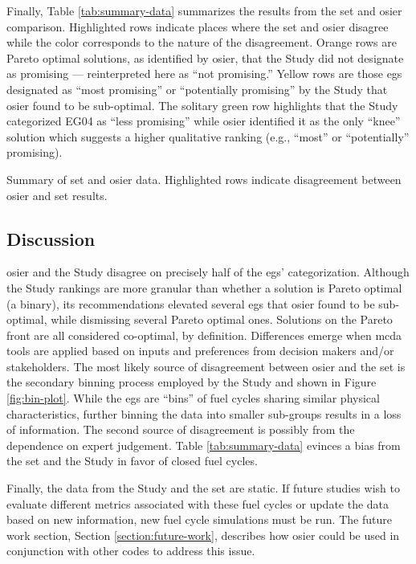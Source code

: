 \noindent
Finally, Table \ref{tab:summary-data} summarizes the results from the \ac{set}
and \ac{osier} comparison. Highlighted rows indicate places where the \ac{set}
and \ac{osier} disagree while the color corresponds to the nature of the
disagreement. Orange rows are Pareto optimal solutions, as identified by
\ac{osier}, that the Study did not designate as promising --- reinterpreted here
as ``not promising.'' Yellow rows are those \acp{eg} designated as ``most
promising'' or ``potentially promising'' by the Study that \ac{osier} found to
be sub-optimal. The solitary green row highlights that the Study categorized
EG04 as ``less promising'' while \ac{osier} identified it as the only ``knee''
solution which suggests a higher qualitative ranking (e.g., ``most'' or
``potentially'' promising). 

\begin{table}[htbp!]
    \centering
    \caption{Summary of \ac{set} and \ac{osier} data. Highlighted rows indicate
    disagreement between \ac{osier} and \ac{set} results.}
    \label{tab:summary-data}
    \resizebox*{\textwidth}{!}{}
\end{table}

\FloatBarrier

\subsection{Discussion}

\ac{osier} and the Study disagree on precisely half of the \acp{eg}'
categorization. Although the Study rankings are more granular than whether a
solution is Pareto optimal (a binary), its recommendations elevated several
\acp{eg} that \ac{osier} found to be sub-optimal, while dismissing several
Pareto optimal ones. Solutions on the Pareto front are all considered
co-optimal, by definition. Differences emerge when \ac{mcda} tools are applied
based on inputs and preferences from decision makers and/or stakeholders. The
most likely source of disagreement between \ac{osier} and the \ac{set} is the
secondary binning process employed by the Study and shown in Figure
\ref{fig:bin-plot}. While the \acp{eg} are ``bins'' of fuel cycles sharing
similar physical characteristics, further binning the data into smaller
sub-groups results in a loss of information. The second source of disagreement
is possibly from the dependence on expert judgement. Table
\ref{tab:summary-data} evinces a bias from the \ac{set} and the Study in favor
of closed fuel cycles.

Finally, the data from the Study and the \ac{set} are static. If future studies
wish to evaluate different metrics associated with these fuel cycles or update
the data based on new information, new fuel cycle simulations must be run. The
future work section, Section \ref{section:future-work}, describes how \ac{osier}
could be used in conjunction with other codes to address this issue. 